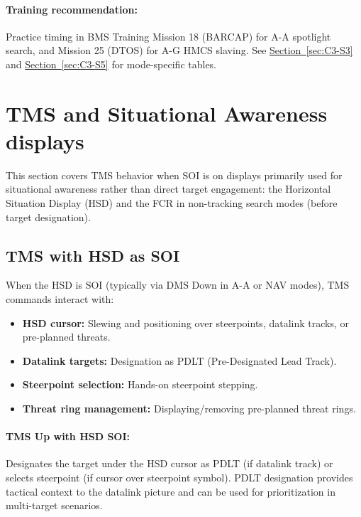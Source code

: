 \documentclass[11pt, a4paper, twoside]{report}
\newcommand{\secref}[1]{\hyperref[#1]{Section~\ref*{#1}}}
\begin{document}
\paragraph{Training recommendation:}
Practice timing in BMS Training Mission 18 (BARCAP) for A-A spotlight search, and Mission 25 (DTOS) for A-G HMCS slaving. See \secref{sec:C3-S3} and \secref{sec:C3-S5} for mode-specific tables.

\newpage
\section{TMS and Situational Awareness displays}
\label{sec:C4-S2}

This section covers TMS behavior when SOI is on displays primarily used for situational awareness rather than direct target engagement: the Horizontal Situation Display (HSD) and the FCR in non-tracking search modes (before target designation).

\subsection{TMS with HSD as SOI}
\label{sec:C4-S2-S1}

When the HSD is SOI (typically via DMS Down in A-A or NAV modes), TMS commands interact with:
\begin{itemize}
    \item \textbf{HSD cursor:} Slewing and positioning over steerpoints, datalink tracks, or pre-planned threats.
    \item \textbf{Datalink targets:} Designation as PDLT (Pre-Designated Lead Track).
    \item \textbf{Steerpoint selection:} Hands-on steerpoint stepping.
    \item \textbf{Threat ring management:} Displaying/removing pre-planned threat rings.
\end{itemize}

\paragraph{TMS Up with HSD SOI:}
Designates the target under the HSD cursor as PDLT (if datalink track) or selects steerpoint (if cursor over steerpoint symbol). PDLT designation provides tactical context to the datalink picture and can be used for prioritization in multi-target scenarios.
\end{document}
